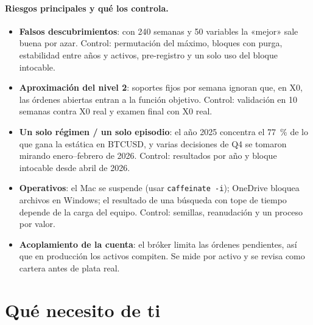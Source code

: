 \documentclass[11pt,a4paper]{article}
\newcommand{\code}[1]{\texttt{\small #1}}
\begin{document}
\paragraph{Riesgos principales y qué los controla.}
\begin{itemize}[leftmargin=1.4em]
  \item \textbf{Falsos descubrimientos}: con 240 semanas y 50 variables la «mejor» sale buena por azar. Control: permutación del máximo,
        bloques con purga, estabilidad entre años y activos, pre-registro y un solo uso del bloque intocable.
  \item \textbf{Aproximación del nivel 2}: soportes fijos por semana ignoran que, en X0, las órdenes abiertas entran a la función
        objetivo. Control: validación en 10 semanas contra X0 real y examen final con X0 real.
  \item \textbf{Un solo régimen / un solo episodio}: el año 2025 concentra el 77~\% de lo que gana la estática en BTCUSD, y varias
        decisiones de Q4 se tomaron mirando enero--febrero de 2026. Control: resultados por año y bloque intocable desde abril de 2026.
  \item \textbf{Operativos}: el Mac se suspende (usar \code{caffeinate -i}); OneDrive bloquea archivos en Windows; el resultado de una búsqueda
        con tope de tiempo depende de la carga del equipo. Control: semillas, reanudación y un proceso por valor.
  \item \textbf{Acoplamiento de la cuenta}: el bróker limita las órdenes pendientes, así que en producción los activos compiten. Se mide
        por activo y se revisa como cartera antes de plata real.
\end{itemize}

\section{Qué necesito de ti}\label{sec:decisiones}
\end{document}
